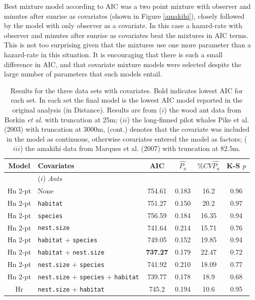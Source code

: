 \documentclass[useAMS,referee, usegraphicx]{biom}
\begin{document}
Best mixture model according to AIC was a two point mixture with observer and minutes after sunrise as covariates (shown in Figure \ref{amakihi}), closely followed by the model with only observer as a covariate. In this case a hazard-rate with observer and minutes after sunrise as covariates beat the mixtures in AIC terms. This is not too surprising given that the mixtures use one more parameter than a hazard-rate in this situation. It is encouraging that there is such a small difference in AIC, and that covariate mixture models were selected despite the large number of parameters that such models entail.


\begin{table}
\caption{Results for the three data sets with covariates. Bold indicates lowest AIC for each set. In each set the final model is the lowest AIC model reported in the original analysis (in Distance). Results are from ($i$) the wood ant data from Borkin \textit{et al.} with truncation at 25m; ($ii$) the long-finned pilot whales Pike et al. (2003) with truncation at 3000m, (cont.) denotes that the covariate was included in the model as continuous, otherwise covariates entered the model as factors; ($iii$) the amakihi data from Marques et al. (2007) with truncation at 82.5m.}
\centering
\begin{tabular}{c l c c c c}
\hline \hline
Model & Covariates & AIC & $\hat{P_a}$ & $\% CV \hat{P_a}$ & K-S $p$\\
\hline
 & ($i$) \textit{Ants} & & & & \\
Hn 2-pt & None & 754.61 & 0.183 & 16.2 & 0.96 \\
Hn 2-pt & \texttt{habitat} & 751.27 & 0.150 & 20.2 & 0.97 \\ 
Hn 2-pt & \texttt{species} & 756.59 & 0.184 & 16.35 & 0.94 \\  
Hn 2-pt & \texttt{nest.size} & 741.64 & 0.214 & 15.71 & 0.76 \\   
Hn 2-pt & \texttt{habitat} + \texttt{species} & 749.05 & 0.152 & 19.85 & 0.94\\ 
Hn 2-pt & \texttt{habitat} + \texttt{nest.size} & \textbf{737.27} & 0.179 & 22.47 & 0.72\\
Hn 2-pt & \texttt{nest.size} + \texttt{species} & 741.92 & 0.210 & 18.09 & 0.77\\
Hn 2-pt & \texttt{nest.size} + \texttt{species} + \texttt{habitat} & 739.77 & 0.178 & 18.9 & 0.68 \\
Hr & \texttt{nest.size} + \texttt{habitat} & 745.2 & 0.194 & 10.6 & 0.95\\

\end{tabular}
\end{table}
\end{document}
